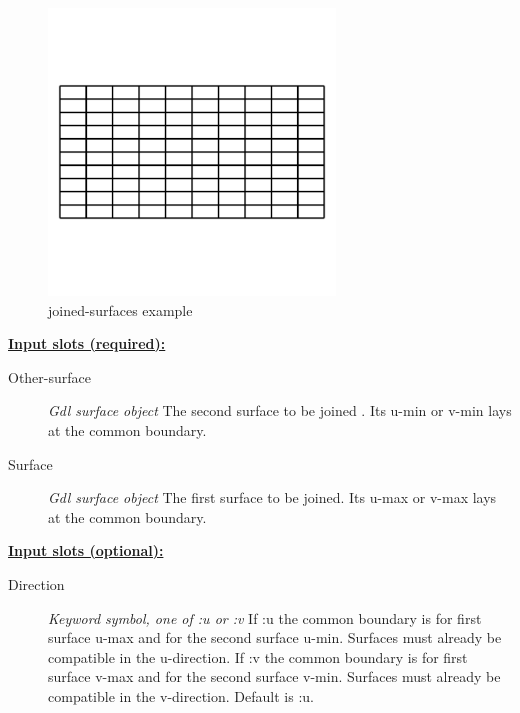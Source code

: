 \documentclass [11pt]{book}
\begin{document}
\begin{itemize}
\begin{figure}
\begin{center}
\includegraphics[width=3in,height=3in]{../images/example-joined-surfaces.pdf}
\end{center}

\caption{joined-surfaces example}

\label{fig:joined-surfaces}

\end{figure}





\textbf{
\underline{Input slots (required):}}

\begin{description}

\item [Other-surface]
\emph{Gdl surface object} The second surface to be joined . Its u-min or v-min lays at the common boundary.


\item [Surface]
\emph{Gdl surface object} The first surface to be joined. Its u-max or v-max lays at the common boundary.


\end{description}






\textbf{
\underline{Input slots (optional):}}

\begin{description}

\item [Direction]
\emph{Keyword symbol, one of :u or :v} If :u the common boundary is for first surface u-max and for the second surface u-min. Surfaces must already be compatible in the u-direction. If :v the common boundary is for first surface v-max and for the second surface v-min. Surfaces must already be compatible in the v-direction. Default is :u.



\end{description}
\end{itemize}
\end{document}
